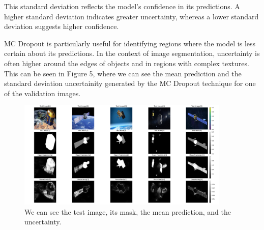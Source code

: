 \documentclass{article}
\begin{document}
This standard deviation reflects the model's confidence in its predictions. A higher standard deviation indicates greater 
uncertainty, whereas a lower standard deviation suggests higher confidence. 

MC Dropout is particularly useful for identifying regions where the model is less certain about its predictions. In the 
context of image segmentation, uncertainty is often higher around the edges of objects and in regions with complex textures. 
This can be seen in Figure 5, where we can see the mean prediction and the standard deviation uncertainity generated by 
the MC Dropout technique for one of the validation images.

\begin{figure}[h]
    \centering
    \includegraphics[width=0.9\textwidth]{../images/MC_dropout/test_image[0-5].png}
    \caption{We can see the test image, its mask, the mean prediction, and the uncertainty.}
    \label{fig:mc_dropout_single_image}
\end{figure}
\vspace{1em}
\end{document}
